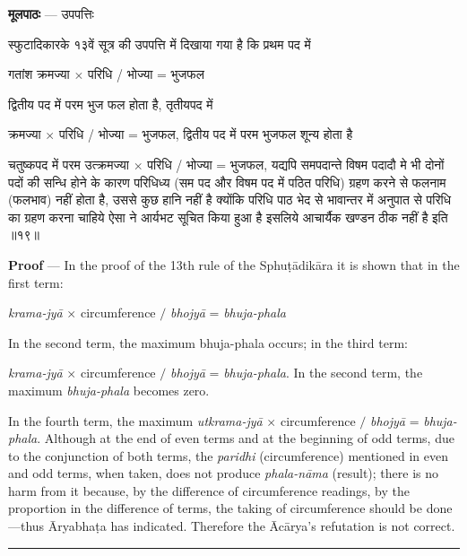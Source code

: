 \documentclass[11pt,a4paper]{article}
\newcommand{\skt}[1]{{\devanagarifont\color{sktcolor} #1}}
\newenvironment{bilingual}{%
  \par\noindent
  \begin{minipage}[t]{0.47\textwidth}%
}{%
  \par\end{minipage}%
}
\newcommand{\rightcol}{%
  \par\end{minipage}%
  \hfill
  \begin{minipage}[t]{0.47\textwidth}%
}
\begin{document}
\begin{bilingual}
\textbf{मूलपाठः} --- \skt{उपपत्तिः}

\skt{स्फुटादिकारके १३वें सूत्र की उपपत्ति में दिखाया गया है कि प्रथम पद में}

\skt{गतांश क्रमज्या $\times$ परिधि / भोज्या = भुजफल}

\skt{द्वितीय पद में परम भुज फल होता है, तृतीयपद में}

\skt{क्रमज्या $\times$ परिधि / भोज्या = भुजफल, द्वितीय पद में परम भुजफल शून्य होता है}

\skt{चतुष्कपद में परम उत्क्रमज्या $\times$ परिधि / भोज्या = भुजफल, यद्यपि समपदान्ते विषम पदादौ मे भी दोनों पदों की सन्धि होने के कारण परिधिध्य (सम पद और विषम पद में पठित परिधि) ग्रहण करने से फलनाम (फलभाव) नहीं होता है, उससे कुछ हानि नहीं है क्योंकि परिधि पाठ भेद से भावान्तर में अनुपात से परिधि का ग्रहण करना चाहिये ऐसा ने आर्यभट सूचित किया हुआ है इसलिये आचार्यैक खण्डन ठीक नहीं है इति} ॥१९॥
\rightcol
\textbf{Proof} --- In the proof of the 13th rule of the Sphuṭādikāra it is shown that in the first term:

\textit{krama-jyā} $\times$ circumference $/$ \textit{bhojyā} = \textit{bhuja-phala}

In the second term, the maximum bhuja-phala occurs; in the third term:

\textit{krama-jyā} $\times$ circumference $/$ \textit{bhojyā} = \textit{bhuja-phala}. In the second term, the maximum \textit{bhuja-phala} becomes zero.

In the fourth term, the maximum \textit{utkrama-jyā} $\times$ circumference $/$ \textit{bhojyā} = \textit{bhuja-phala}. Although at the end of even terms and at the beginning of odd terms, due to the conjunction of both terms, the \textit{paridhi} (circumference) mentioned in even and odd terms, when taken, does not produce \textit{phala-nāma} (result); there is no harm from it because, by the difference of circumference readings, by the proportion in the difference of terms, the taking of circumference should be done---thus Āryabhaṭa has indicated. Therefore the Ācārya's refutation is not correct.
\end{bilingual}

\medskip
\noindent\rule{\textwidth}{0.4pt}
\end{document}
